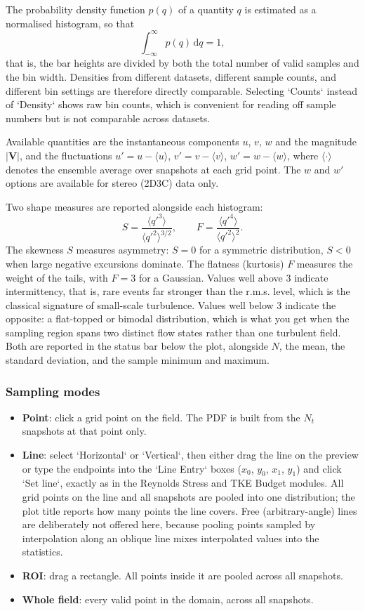 The probability density function $p(q)$ of a quantity $q$ is estimated as a normalised histogram, so that
\[
\int_{-\infty}^{\infty} p(q)\,\mathrm{d}q = 1 ,
\]
that is, the bar heights are divided by both the total number of valid samples and the bin width. Densities from different datasets, different sample counts, and different bin settings are therefore directly comparable. Selecting `Counts` instead of `Density` shows raw bin counts, which is convenient for reading off sample numbers but is not comparable across datasets.

Available quantities are the instantaneous components $u$, $v$, $w$ and the magnitude $|\mathbf{V}|$, and the fluctuations $u' = u - \langle u \rangle$, $v' = v - \langle v \rangle$, $w' = w - \langle w \rangle$, where $\langle \cdot \rangle$ denotes the ensemble average over snapshots at each grid point. The $w$ and $w'$ options are available for stereo (2D3C) data only.

Two shape measures are reported alongside each histogram:
\[
S = \frac{\langle q'^3 \rangle}{\langle q'^2 \rangle^{3/2}}, \qquad
F = \frac{\langle q'^4 \rangle}{\langle q'^2 \rangle^{2}} .
\]
The skewness $S$ measures asymmetry: $S = 0$ for a symmetric distribution, $S < 0$ when large negative excursions dominate. The flatness (kurtosis) $F$ measures the weight of the tails, with $F = 3$ for a Gaussian. Values well above 3 indicate intermittency, that is, rare events far stronger than the r.m.s. level, which is the classical signature of small-scale turbulence. Values well below 3 indicate the opposite: a flat-topped or bimodal distribution, which is what you get when the sampling region spans two distinct flow states rather than one turbulent field. Both are reported in the status bar below the plot, alongside $N$, the mean, the standard deviation, and the sample minimum and maximum.

\subsubsection*{Sampling modes}

\begin{itemize}[leftmargin=1.5em]
  \item \textbf{Point}: click a grid point on the field. The PDF is built from the $N_t$ snapshots at that point only.
  \item \textbf{Line}: select `Horizontal` or `Vertical`, then either drag the line on the preview or type the endpoints into the `Line Entry` boxes ($x_0$, $y_0$, $x_1$, $y_1$) and click `Set line`, exactly as in the Reynolds Stress and TKE Budget modules. All grid points on the line and all snapshots are pooled into one distribution; the plot title reports how many points the line covers. Free (arbitrary-angle) lines are deliberately not offered here, because pooling points sampled by interpolation along an oblique line mixes interpolated values into the statistics.
  \item \textbf{ROI}: drag a rectangle. All points inside it are pooled across all snapshots.
  \item \textbf{Whole field}: every valid point in the domain, across all snapshots.
\end{itemize}


